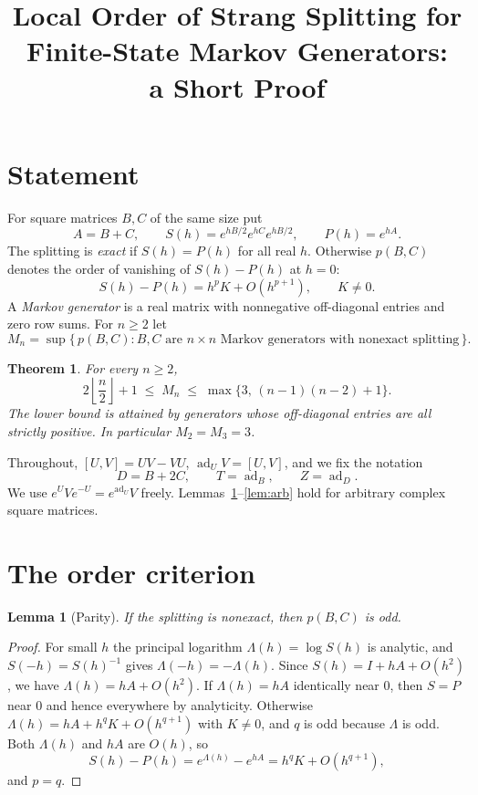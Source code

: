 \documentclass[11pt]{article}
\title{Local Order of Strang Splitting for Finite-State Markov Generators:\\
a Short Proof}
\author{}
\date{}
\newtheorem{theorem}{Theorem}
\newtheorem{lemma}{Lemma}
\theoremstyle{remark}
\newcommand{\ad}{\operatorname{ad}}
\begin{document}
\maketitle

\section{Statement}

For square matrices $B,C$ of the same size put
$$
A=B+C,\qquad S(h)=e^{hB/2}e^{hC}e^{hB/2},\qquad P(h)=e^{hA}.
$$
The splitting is \emph{exact} if $S(h)=P(h)$ for all real $h$. Otherwise
$p(B,C)$ denotes the order of vanishing of $S(h)-P(h)$ at $h=0$:
$$
S(h)-P(h)=h^{p}K+O(h^{p+1}),\qquad K\neq 0 .
$$
A \emph{Markov generator} is a real matrix with nonnegative off-diagonal
entries and zero row sums. For $n\ge 2$ let
$$
M_n=\sup\{\,p(B,C): B,C \text{ are } n\times n \text{ Markov generators
with nonexact splitting}\,\}.
$$

\begin{theorem}\label{thm:main}
For every $n\ge 2$,
$$
2\left\lfloor \frac n2\right\rfloor+1\;\le\; M_n\;\le\;\max\{3,\,(n-1)(n-2)+1\}.
$$
The lower bound is attained by generators whose off-diagonal entries are
all strictly positive. In particular $M_2=M_3=3$.
\end{theorem}

Throughout, $[U,V]=UV-VU$, $\ad_U V=[U,V]$, and we fix the notation
$$
\boxed{\;D=B+2C,\qquad T=\ad_B,\qquad Z=\ad_D.\;}
$$
We use $e^{U}Ve^{-U}=e^{\ad_U}V$ freely. Lemmas~\ref{lem:parity}--\ref{lem:arb}
hold for arbitrary complex square matrices.

\section{The order criterion}

\begin{lemma}[Parity]\label{lem:parity}
If the splitting is nonexact, then $p(B,C)$ is odd.
\end{lemma}

\begin{proof}
For small $h$ the principal logarithm $\Lambda(h)=\log S(h)$ is analytic,
and $S(-h)=S(h)^{-1}$ gives $\Lambda(-h)=-\Lambda(h)$. Since
$S(h)=I+hA+O(h^2)$, we have $\Lambda(h)=hA+O(h^2)$. If $\Lambda(h)=hA$
identically near $0$, then $S=P$ near $0$ and hence everywhere by
analyticity. Otherwise $\Lambda(h)=hA+h^{q}K+O(h^{q+1})$ with $K\ne0$,
and $q$ is odd because $\Lambda$ is odd. Both $\Lambda(h)$ and $hA$ are
$O(h)$, so
$$
S(h)-P(h)=e^{\Lambda(h)}-e^{hA}=h^{q}K+O(h^{q+1}),
$$
and $p=q$.
\end{proof}
\end{document}
